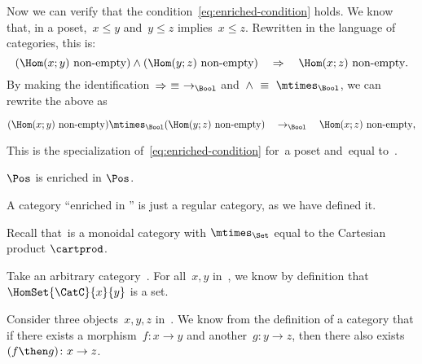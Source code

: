 {\begin{example}
        Now we can verify that the condition~\cref{eq:enriched-condition} holds.
        We know that, in a poset,~$x \leq y$ and~$y \leq z$ implies~$x \leq z$.
        Rewritten in the language of categories, this is:
        \begin{equation*}
            (\Hom(x;y)\ \text{non-empty})
            \wedge
            (\Hom(y; z)\ \text{non-empty})
            \quad
            \Rightarrow
            \quad
            \Hom(x; z)\ \text{non-empty}.
        \end{equation*}
        By making the identification~$\Rightarrow\ \equiv\ \to_{\Bool}$ and~$\wedge\ \equiv\ \mtimes_{\Bool}$, we can rewrite the above as
        \begin{widepar}
            \begin{equation*}
                (\Hom(x;y)\ \text{non-empty})
                \mtimes_{\Bool}
                (\Hom(y; z)\ \text{non-empty})
                \quad
                \to_{\Bool}
                \quad
                \Hom(x; z)\ \text{non-empty},
            \end{equation*}
        \end{widepar}
        This is the specialization of~\cref{eq:enriched-condition}
        for~\CatC a poset and~\CatD equal to~\Bool.
    \end{example}
    \begin{example}
        $\Pos$ is enriched in $\Pos$.
    \end{example}

    \begin{example}
    \end{example}

    \begin{example}
        A category ``enriched in \Set'' is just a regular category, as we have defined it.

        Recall that~\Set is a monoidal category with $\mtimes_{\Set}$ equal to the Cartesian product $\cartprod$.

        Take an arbitrary category~\CatC.
        For all~$x, y$ in~\CatC, we know by definition that~$\HomSet{\CatC}{x}{y}$ is a set.

        Consider three objects~$x,y,z$ in~\CatC.
        We know from the definition of a category that if there exists a morphism~$f: x \to y$ and another~$g: y \to z$, then there also exists~$(f\then g)\colon x \to z$.


\end{example}}
